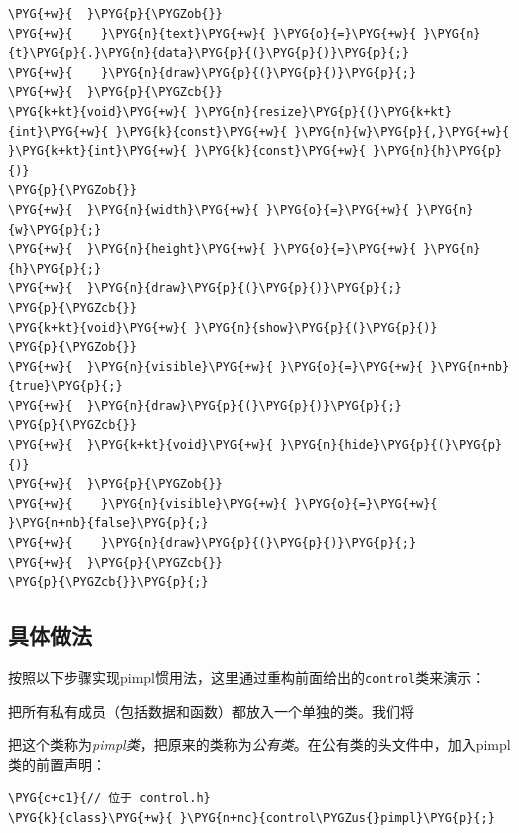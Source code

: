 \begin{codeblockbg}
\begin{Verbatim}[commandchars=\\\{\},breaklines=true,breakanywhere=true,fontsize=\codefont,xleftmargin=17bp]
\PYG{+w}{  }\PYG{p}{\PYGZob{}}
\PYG{+w}{    }\PYG{n}{text}\PYG{+w}{ }\PYG{o}{=}\PYG{+w}{ }\PYG{n}{t}\PYG{p}{.}\PYG{n}{data}\PYG{p}{(}\PYG{p}{)}\PYG{p}{;}
\PYG{+w}{    }\PYG{n}{draw}\PYG{p}{(}\PYG{p}{)}\PYG{p}{;}
\PYG{+w}{  }\PYG{p}{\PYGZcb{}}
\PYG{k+kt}{void}\PYG{+w}{ }\PYG{n}{resize}\PYG{p}{(}\PYG{k+kt}{int}\PYG{+w}{ }\PYG{k}{const}\PYG{+w}{ }\PYG{n}{w}\PYG{p}{,}\PYG{+w}{ }\PYG{k+kt}{int}\PYG{+w}{ }\PYG{k}{const}\PYG{+w}{ }\PYG{n}{h}\PYG{p}{)}
\PYG{p}{\PYGZob{}}
\PYG{+w}{  }\PYG{n}{width}\PYG{+w}{ }\PYG{o}{=}\PYG{+w}{ }\PYG{n}{w}\PYG{p}{;}
\PYG{+w}{  }\PYG{n}{height}\PYG{+w}{ }\PYG{o}{=}\PYG{+w}{ }\PYG{n}{h}\PYG{p}{;}
\PYG{+w}{  }\PYG{n}{draw}\PYG{p}{(}\PYG{p}{)}\PYG{p}{;}
\PYG{p}{\PYGZcb{}}
\PYG{k+kt}{void}\PYG{+w}{ }\PYG{n}{show}\PYG{p}{(}\PYG{p}{)}
\PYG{p}{\PYGZob{}}
\PYG{+w}{  }\PYG{n}{visible}\PYG{+w}{ }\PYG{o}{=}\PYG{+w}{ }\PYG{n+nb}{true}\PYG{p}{;}
\PYG{+w}{  }\PYG{n}{draw}\PYG{p}{(}\PYG{p}{)}\PYG{p}{;}
\PYG{p}{\PYGZcb{}}
\PYG{+w}{  }\PYG{k+kt}{void}\PYG{+w}{ }\PYG{n}{hide}\PYG{p}{(}\PYG{p}{)}
\PYG{+w}{  }\PYG{p}{\PYGZob{}}
\PYG{+w}{    }\PYG{n}{visible}\PYG{+w}{ }\PYG{o}{=}\PYG{+w}{ }\PYG{n+nb}{false}\PYG{p}{;}
\PYG{+w}{    }\PYG{n}{draw}\PYG{p}{(}\PYG{p}{)}\PYG{p}{;}
\PYG{+w}{  }\PYG{p}{\PYGZcb{}}
\PYG{p}{\PYGZcb{}}\PYG{p}{;}
\end{Verbatim}
\end{codeblockbg}



\subsection{具体做法}



按照以下步骤实现pimpl惯用法，这里通过重构前面给出的\texttt{control}类来演示：



把所有私有成员（包括数据和函数）都放入一个单独的类。我们将



把这个类称为\textit{pimpl类}，把原来的类称为\textit{公有类}。在公有类的头文件中，加入pimpl类的前置声明：



\begin{codeblockbg}
\begin{Verbatim}[commandchars=\\\{\},breaklines=true,breakanywhere=true,fontsize=\codefont,xleftmargin=17bp]
\PYG{c+c1}{// 位于 control.h}
\PYG{k}{class}\PYG{+w}{ }\PYG{n+nc}{control\PYGZus{}pimpl}\PYG{p}{;}
\end{Verbatim}
\end{codeblockbg}


